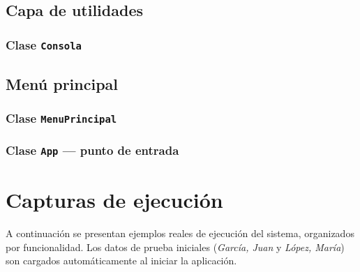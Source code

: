 \documentclass[12pt, a4paper]{article}
\begin{document}
\subsection{Capa de utilidades}

\subsubsection{Clase \texttt{Consola}}


\subsection{Menú principal}

\subsubsection{Clase \texttt{MenuPrincipal}}


\subsubsection{Clase \texttt{App} — punto de entrada}


\newpage
\section{Capturas de ejecución}

A continuación se presentan ejemplos reales de ejecución del sistema,
organizados por funcionalidad. Los datos de prueba iniciales
(\textit{García, Juan} y \textit{López, María}) son cargados
automáticamente al iniciar la aplicación.

\end{document}

